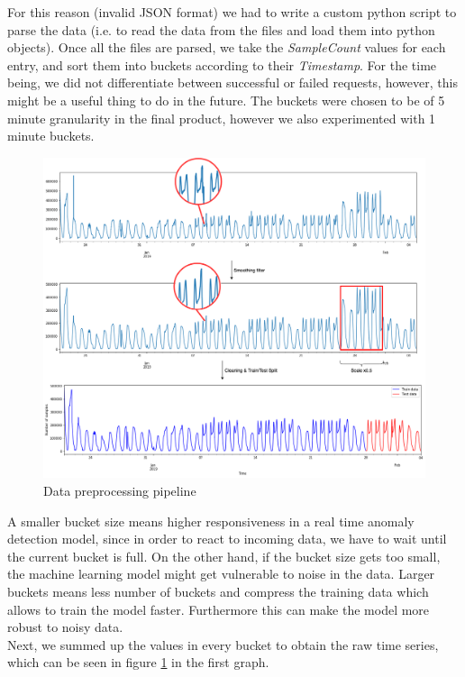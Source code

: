 For this reason (invalid JSON format) we had to write a custom python script to parse the data (i.e. to read the data from the files and load them into python objects). Once all the files are parsed, we take the \textit{SampleCount} values for each entry, and sort them into buckets according to their \textit{Timestamp}. For the time being, we did not differentiate between successful or failed requests, however, this might be a useful thing to do in the future. The buckets were chosen to be of 5 minute granularity in the final product, however we also experimented with 1 minute buckets.
\begin{figure}[h]
    \centering
    \includegraphics[width=1\textwidth]{images/data_preprocessing.png}
    \caption{Data preprocessing pipeline}
    \label{fig:data_preprocessing}
\end{figure}
\afterpage{\FloatBarrier}
A smaller bucket size means higher responsiveness in a real time anomaly detection model, since in order to react to incoming data, we have to wait until the current bucket is full. On the other hand, if the bucket size gets too small, the machine learning model might get vulnerable to noise in the data. Larger buckets means less number of buckets and compress the training data which allows to train the model faster. Furthermore this can make the model more robust to noisy data. \\
Next, we summed up the values in every bucket to obtain the raw time series, which can be seen in figure \ref{fig:data_preprocessing} in the first graph. 
